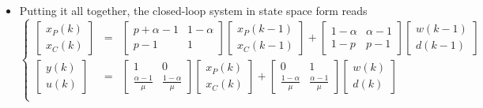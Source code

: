 \begin{frame}
\myPause
 \begin{itemize}[<+-| alert@+>]
 \item Putting it all together, the closed-loop system in state space form reads
       \begin{displaymath}
        \left\{\begin{array}{rcl}
         \begin{bmatrix} x_P(k) \\ x_C(k) \end{bmatrix}
         &=& 
         \begin{bmatrix} p+\alpha-1 & 1-\alpha \\ p-1 & 1  \end{bmatrix}
         \begin{bmatrix} x_P(k-1) \\ x_C(k-1) \end{bmatrix}
         +
         \begin{bmatrix} 1-\alpha & \alpha-1 \\ 1-p & p-1  \end{bmatrix}
         \begin{bmatrix} w(k-1) \\ d(k-1) \end{bmatrix} \\
         \begin{bmatrix} y(k) \\ u(k) \end{bmatrix}
         &=& 
         \begin{bmatrix} 1 & 0 \\ \frac{\alpha-1}{\mu} & \frac{1-\alpha}{\mu} \end{bmatrix}
         \begin{bmatrix} x_P(k) \\ x_C(k) \end{bmatrix}
         +
         \begin{bmatrix} 0 & 1 \\ \frac{1-\alpha}{\mu} & \frac{\alpha-1}{\mu} \end{bmatrix}
         \begin{bmatrix} w(k) \\ d(k) \end{bmatrix} \\
        \end{array}\right.
       \end{displaymath}

\end{itemize}
\end{frame}
